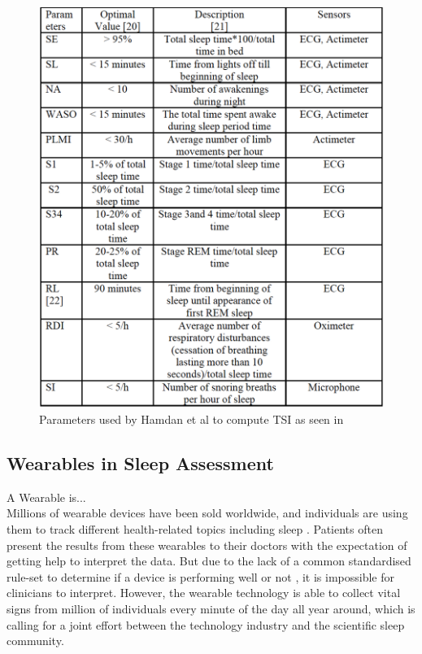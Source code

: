 \documentclass[12pt]{article} %
\begin{document}
\begin{figure}[H]
    \centering
        \includegraphics[width=\textwidth]{img/parameters}
        \caption{Parameters used by Hamdan et al to compute TSI as seen in \cite{Hamdan2012ABS}}
        \label{fig:parameters}
\end{figure}


\subsection{Wearables in Sleep Assessment}
A Wearable is... \\

Millions of wearable devices have been sold worldwide, and individuals are using them to track different health-related topics including sleep \cite{boom}. Patients often present the results from these wearables to their doctors with the expectation of getting help to interpret the data. But due to the lack of a common standardised rule-set to determine if a device is performing well or not \cite{boom}, it is impossible for clinicians to interpret. However, the wearable technology is able to collect vital signs from million of individuals every minute of the day all year around, which is calling for a joint effort between the technology industry and the scientific sleep community. \\
\end{document}
